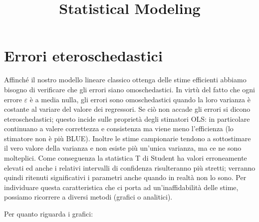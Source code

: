 \documentclass[a4page, 11pt]{article}
\title{Statistical Modeling}
\author{}
\date{}
\begin{document}
\maketitle
\section{Errori eteroschedastici}
Affinché il nostro modello lineare classico ottenga delle stime efficienti abbiamo bisogno di verificare che gli errori siano omoschedastici. 
In virtù del fatto che ogni errore $\varepsilon$ è a media nulla, gli errori sono omoschedastici quando la loro varianza è costante al variare del valore dei regressori.
Se ciò non accade gli errori si dicono eteroschedastici; questo incide sulle proprietà degli stimatori OLS: in particolare continuano a valere correttezza e consistenza ma viene meno l’efficienza (lo stimatore non è più BLUE). 
Inoltre le stime campionarie tendono a sottostimare il vero valore della varianza e non esiste più un’unica varianza, ma ce ne sono molteplici. 
Come conseguenza la statistica T di Student ha valori erroneamente elevati ed anche i relativi intervalli di confidenza risulteranno più stretti; verranno quindi ritenuti significativi i parametri anche quando in realtà non lo sono. 
Per individuare questa caratteristica che ci porta ad un’inaffidabilità delle stime, possiamo ricorrere a diversi metodi (grafici o analitici).

Per quanto riguarda i grafici:
\end{document}
